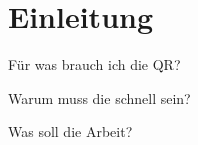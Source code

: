 \chapter{Einleitung}

Für was brauch ich die QR?

Warum muss die schnell sein?

Was soll die Arbeit?